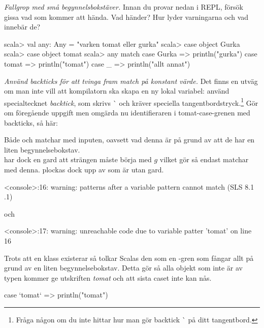 \Subtask \emph{Fallgrop med små begynnelsbokstäver.} Innan du provar nedan i REPL, försök gissa vad som kommer att hända. Vad händer? Hur lyder varningarna och vad innebär de?
\begin{REPL}
scala> val any: Any = "varken tomat eller gurka"
scala> case object Gurka
scala> case object tomat
scala> any match {
         case Gurka => println("gurka")
         case tomat => println("tomat")
         case _ => println("allt annat")
       }
\end{REPL}

\Subtask \emph{Använd backticks för att tvinga fram match på konstant värde.} Det finns en utväg om man inte vill att kompilatorn ska skapa en ny lokal variabel: använd specialtecknet \emph{backtick}, som skrivs \`{} och kräver speciella tangentbordstryck.\footnote{Fråga någon om du inte hittar hur man gör backtick \`{} på ditt tangentbord.}  Gör om föregående uppgift men omgärda nu identifieraren  i tomat-case-grenen med backticks, så här: 



\SOLUTION


\TaskSolved \what


\SubtaskSolved  Både  och  matchar med inputen, oavsett vad denna är på grund av att de har en liten begynnelsebokstav.\\
  har dock en gard att strängen måste börja med $g$ vilket gör så endast  matchar med denna.  plockas dock upp av  som är utan gard.

\SubtaskSolved
\begin{REPL}
<console>:16: warning: patterns after a variable pattern cannot match (SLS 8.1
.1)
\end{REPL}
och
\begin{REPL}
<console>:17: warning: unreachable code due to variable patter 'tomat' on line
16
\end{REPL}
Trots att en klass  existerar så tolkar Scalas  den som en -gren som fångar allt på grund av en liten begynnelsebokstav. Detta gör så alla objekt som inte är av typen  kommer ge utskriften \textit{tomat} och att sista caset inte kan nås.

\SubtaskSolved
\begin{Code}
case `tomat` => println("tomat")
\end{Code}



